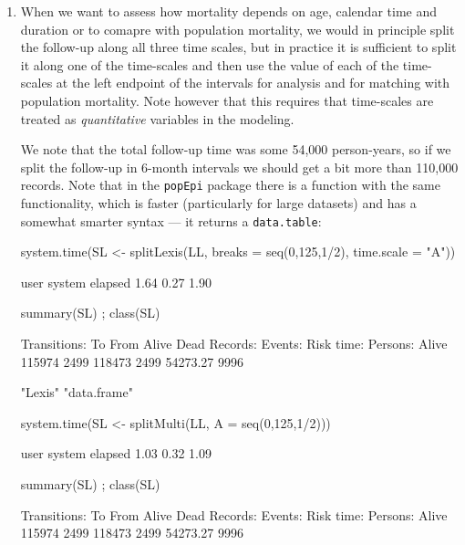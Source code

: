 \begin{enumerate}
\item When we want to assess how mortality depends on age, calendar
  time and duration or to comapre with population mortality, we would
  in principle split the follow-up along all three time scales, but in
  practice it is sufficient to split it along one of the time-scales
  and then use the value of each of the time-scales at the left
  endpoint of the intervals for analysis and for matching with
  population mortality. Note however that this requires that
  time-scales are treated as \emph{quantitative} variables in the
  modeling.

  We note that the total follow-up time was some 54,000 person-years,
  so if we split the follow-up in 6-month intervals we should get a
  bit more than 110,000 records. Note that in the \texttt{popEpi}
  package there is a function with the same functionality, which is
  faster (particularly for large datasets) and has a somewhat smarter
  syntax --- it returns a \texttt{data.table}:
\begin{Schunk}
\begin{Sinput}
 system.time(SL <- splitLexis(LL, breaks = seq(0,125,1/2), time.scale = "A"))
\end{Sinput}
\begin{Soutput}
   user  system elapsed 
   1.64    0.27    1.90 
\end{Soutput}
\begin{Sinput}
 summary(SL) ; class(SL)
\end{Sinput}
\begin{Soutput}
Transitions:
     To
From     Alive Dead  Records:  Events: Risk time:  Persons:
  Alive 115974 2499    118473     2499   54273.27      9996
\end{Soutput}
\begin{Soutput}
[1] "Lexis"      "data.frame"
\end{Soutput}
\begin{Sinput}
 system.time(SL <- splitMulti(LL, A = seq(0,125,1/2)))
\end{Sinput}
\begin{Soutput}
   user  system elapsed 
   1.03    0.32    1.09 
\end{Soutput}
\begin{Sinput}
 summary(SL) ; class(SL)
\end{Sinput}
\begin{Soutput}
Transitions:
     To
From     Alive Dead  Records:  Events: Risk time:  Persons:
  Alive 115974 2499    118473     2499   54273.27      9996
\end{Soutput}

\end{Schunk}
\end{enumerate}
